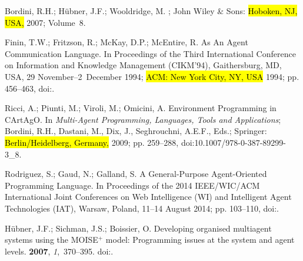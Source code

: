 \documentclass[jsan,article,accept,moreauthors,pdftex]{Definitions/mdpi}
\begin{document}
\begin{thebibliography}{999}
Bordini, R.H.; H{\"u}bner, J.F.; Wooldridge, M.
;
   John Wiley \& Sons:  \hl{Hoboken, NJ, USA,} %
  2007; Volume~8.

Finin, T.W.; Fritzson, R.; McKay, D.P.; McEntire, R.
 As An Agent Communication Language.
\newblock  In Proceedings of the Third International Conference on Information and
  Knowledge Management (CIKM'94), Gaithersburg, MD, USA, 29 November--\mbox{2 December} 1994; \hl{ACM: New York City, NY, USA} %
 1994; pp. 456--463,
\newblock
  doi:{\href{https://doi.org/10.1145/191246.191322}{}}.

Ricci, A.; Piunti, M.; Viroli, M.; Omicini, A.
\newblock Environment Programming in CArtAgO. In {\em Multi-Agent Programming,
  Languages, Tools and Applications}; Bordini, R.H., Dastani, M., Dix, J.,
  Seghrouchni, A.E.F., Eds.; Springer:  \hl{Berlin/Heidelberg, Germany,} %
 2009; pp. 259--288,
\newblock
  doi:10.1007/978-0-387-89299-3\_8.

Rodriguez, S.; Gaud, N.; Galland, S.
 {A} General-Purpose Agent-Oriented Programming Language.
\newblock  In Proceedings of the 2014 {IEEE/WIC/ACM} International Joint Conferences on Web
  Intelligence {(WI)} and Intelligent Agent Technologies (IAT), Warsaw, Poland,
 11--14 August 2014;  pp.
  103--110,
\newblock
  doi:{\href{https://doi.org/10.1109/WI-IAT.2014.156}{}}.

H{\"{u}}bner, J.F.; Sichman, J.S.; Boissier, O.
\newblock Developing organised multiagent systems using the
  MOISE\({}^{\mbox{+}}\) model: Programming issues at the system and agent
  levels.
 {\bf 2007}, {\em
  1},~370--395.
\newblock
  doi:{\href{https://doi.org/10.1504/IJAOSE.2007.016266}{}}.


\end{thebibliography}
\end{document}
